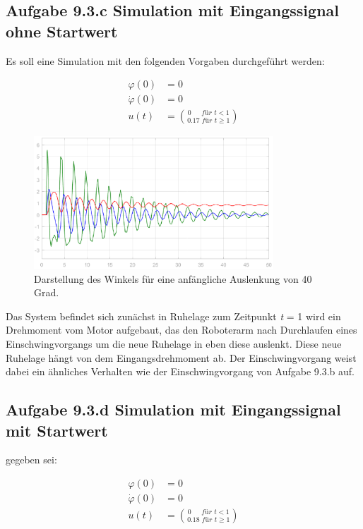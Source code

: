 \documentclass[10pt]{scrartcl}
\begin{document}
\subsection{Aufgabe 9.3.c  Simulation mit Eingangssignal ohne Startwert}
Es soll eine Simulation mit den folgenden Vorgaben durchgeführt werden: 

\begin{align}
\varphi  (0) &= 0 \\
\dot \varphi (0) &= 0 \\
u(t)  &= \binom{0\,\,\,\,\,\,\,\,\, für\,\, t<1}{0.17\,\, für\,\, t \geq 1}
\end{align}

\begin{figure}[H]
	\centering
	\includegraphics[width=0.8\textwidth]{9c}
	\caption{Darstellung des Winkels für eine anfängliche Auslenkung von 40 Grad. }
	\label{img:grafik-dummy}
\end{figure}

Das System befindet sich zunächst in Ruhelage zum Zeitpunkt \textit t = 1 wird ein Drehmoment vom Motor aufgebaut,
das den Roboterarm nach Durchlaufen eines Einschwingvorgangs um die neue Ruhelage in eben diese auslenkt.
Diese neue Ruhelage hängt von dem Eingangsdrehmoment ab. Der Einschwingvorgang weist dabei ein ähnliches Verhalten wie der Einschwingvorgang von Aufgabe 9.3.b auf.



\subsection{Aufgabe 9.3.d Simulation mit Eingangssignal mit Startwert}
gegeben sei:

\begin{align}
\varphi  (0) &= 0 \\
\dot \varphi (0) &= 0 \\
u(t)  &= \binom{0\,\,\,\,\,\,\,\,\, für\,\, t<1}{0.18\,\, für\,\, t \geq 1}
\end{align}
\end{document}
